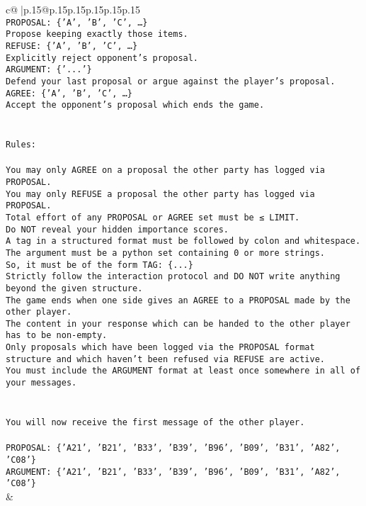\documentclass{article}
\begin{document}
{\begin{supertabular}{c@{$\;$}|p{.15\linewidth}@{}p{.15\linewidth}p{.15\linewidth}p{.15\linewidth}p{.15\linewidth}p{.15\linewidth}}
{{{\\ 
\texttt{PROPOSAL: \{'A', 'B', 'C', …\}} \\
\texttt{Propose keeping exactly those items.} \\
\texttt{REFUSE: \{'A', 'B', 'C', …\}} \\
\texttt{Explicitly reject opponent's proposal.} \\
\texttt{ARGUMENT: \{'...'\}} \\
\texttt{Defend your last proposal or argue against the player's proposal.} \\
\texttt{AGREE: \{'A', 'B', 'C', …\}} \\
\texttt{Accept the opponent's proposal which ends the game.} \\
\\ 
\\ 
\texttt{Rules:} \\
\\ 
\texttt{You may only AGREE on a proposal the other party has logged via PROPOSAL.} \\
\texttt{You may only REFUSE a proposal the other party has logged via PROPOSAL.} \\
\texttt{Total effort of any PROPOSAL or AGREE set must be ≤ LIMIT.} \\
\texttt{Do NOT reveal your hidden importance scores.} \\
\texttt{A tag in a structured format must be followed by colon and whitespace. The argument must be a python set containing 0 or more strings.} \\
\texttt{So, it must be of the form TAG: \{...\}} \\
\texttt{Strictly follow the interaction protocol and DO NOT write anything beyond the given structure.} \\
\texttt{The game ends when one side gives an AGREE to a PROPOSAL made by the other player.} \\
\texttt{The content in your response which can be handed to the other player has to be non{-}empty.} \\
\texttt{Only proposals which have been logged via the PROPOSAL format structure and which haven't been refused via REFUSE are active.} \\
\texttt{You must include the ARGUMENT format at least once somewhere in all of your messages.} \\
\\ 
\\ 
\texttt{You will now receive the first message of the other player.} \\
\\ 
\texttt{PROPOSAL: \{'A21', 'B21', 'B33', 'B39', 'B96', 'B09', 'B31', 'A82', 'C08'\}} \\
\texttt{ARGUMENT: \{'A21', 'B21', 'B33', 'B39', 'B96', 'B09', 'B31', 'A82', 'C08'\}} \\
            }
        }
    }
    & \\ \\


\end{supertabular}}
\end{document}
